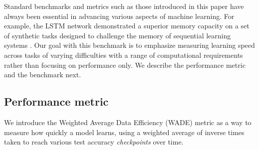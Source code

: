 Standard benchmarks and metrics such as those introduced in this paper have
always been essential in advancing various aspects of machine learning. For
example, the LSTM network demonstrated a superior memory capacity on a set of
synthetic tasks designed to challenge the memory of sequential learning systems
\cite{hochreiterLongShortTermMemory1997}. Our goal with this benchmark is to
emphasize measuring learning speed across tasks of varying difficulties with a
range of computational requirements rather than focusing on performance only. We describe the performance metric and the benchmark next.



\subsection{Performance metric\label{sec:performance-metric}}

We introduce the Weighted Average Data Efficiency (WADE) metric as a way to
measure how quickly a model learns, using a weighted average of inverse times
taken to reach various test accuracy \emph{checkpoints} over time.

